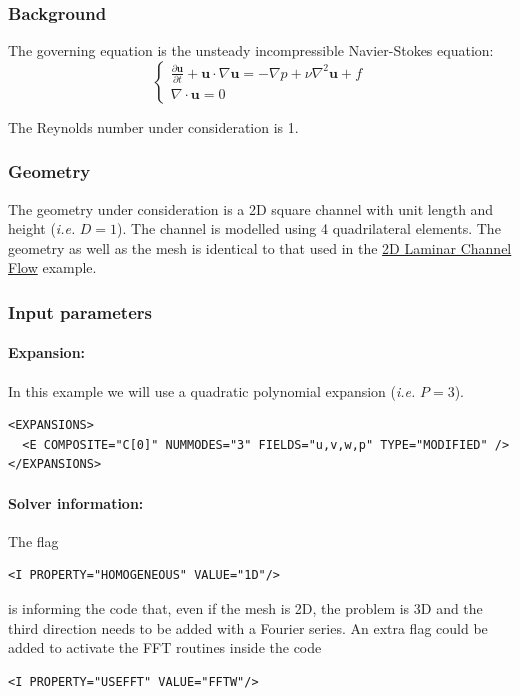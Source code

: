 \subsubsection{Background}
The governing equation is the unsteady incompressible Navier-Stokes equation:
\begin{equation}
\begin{cases}
\frac{\partial \textbf{u}}{\partial t} + \textbf{u} \cdot \nabla \textbf{u} = - \nabla p + \nu \nabla^2 \textbf{u} + f \\
\nabla \cdot \textbf{u} = 0
\end{cases}
\end{equation}

The Reynolds number under consideration is 1.

\subsubsection{Geometry}
The geometry under consideration is a 2D square channel with unit length and height (\textit{i.e.} $D=1$). The channel is modelled using 4 quadrilateral elements. The geometry as well as the mesh is identical to that used in the \hyperref[LaminarChannelFlow2D]{2D Laminar Channel Flow} example.

\subsubsection{Input parameters}
\paragraph{Expansion:~} In this example we will use a quadratic polynomial expansion (\textit{i.e.} $P=3$).
\begin{lstlisting}[style=XMLStyle]
<EXPANSIONS>
  <E COMPOSITE="C[0]" NUMMODES="3" FIELDS="u,v,w,p" TYPE="MODIFIED" />
</EXPANSIONS>
\end{lstlisting}

\paragraph{Solver information:~}  The flag 
\begin{lstlisting}[style=XMLStyle] 
<I PROPERTY="HOMOGENEOUS" VALUE="1D"/> 
\end{lstlisting} 
is informing the code that, even if the mesh is 2D, the problem is 3D and the third direction needs to be added with a Fourier series. An extra flag could be added to activate the FFT routines inside the code 
\begin{lstlisting}[style=XMLStyle]
<I PROPERTY="USEFFT" VALUE="FFTW"/>
\end{lstlisting} 


